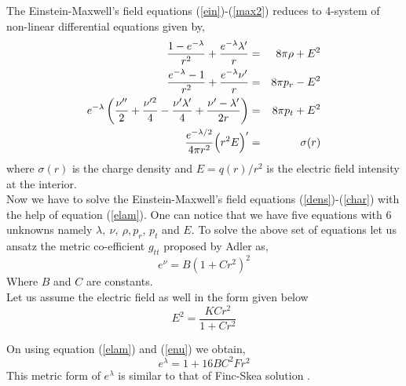 \documentclass[preprintnumbers,amsmath,amssymb,floatfix,9pt,prd,twocolumn,
superscriptaddress,nofootinbib]{revtex4}
\begin{document}
The Einstein-Maxwell's field equations (\ref{ein})-(\ref{max2}) reduces to 4-system of non-linear differential equations given by,
\begin{eqnarray}
\frac{1-e^{-\lambda}}{r^{2}}+\frac{e^{-\lambda}\lambda'}{r} &=& 8\pi\rho+E^{2} \label{dens}\\
\frac{e^{-\lambda}-1}{r^{2}}+\frac{e^{-\lambda}\nu'}{r} &=& 8\pi p_{r}-E^{2}\\
e^{-\lambda}\left(\frac{\nu''}{2}+\frac{\nu'^{2}}{4}-\frac{\nu'\lambda'}{4}+\frac{\nu'-\lambda'}{2r} \right) &=& 8\pi p_t+E^{2} \label{prt}\\
{e^{-\lambda/2} \over 4\pi r^2} \Big(r^2E\Big)' &=& \sigma(r)	\label{char}
\end{eqnarray}
where $\sigma(r)$ is the charge density and $E=q(r)/r^2$ is the electric field intensity at the interior.\\

Now we have to solve the Einstein-Maxwell's field equations (\ref{dens})-(\ref{char}) with the help of equation (\ref{elam}). One can notice that we have five equations with 6 unknowns namely $\lambda,~\nu,~\rho,p_r$, $p_t$ and $E$. To solve the above set of equations let us ansatz the metric co-efficient $g_{tt}$ proposed by Adler \cite{adl} as,
\begin{equation}
e^{\nu}=B(1+Cr^{2})^{2} \label{enu}
\end{equation}
Where $B$ and $C$ are constants.\\

Let us assume the electric field as well in the form given below
\begin{equation}\label{e2}
E^{2}=\frac{KCr^{2}}{1+Cr^{2}}
\end{equation}

On using equation (\ref{elam}) and (\ref{enu}) we obtain,
\begin{equation}
e^{\lambda}=1 + 16 B C^2 F r^2
\end{equation}
 This metric form of $e^\lambda$  is similar to that of Finc-Skea solution \cite{finch}.
\end{document}

